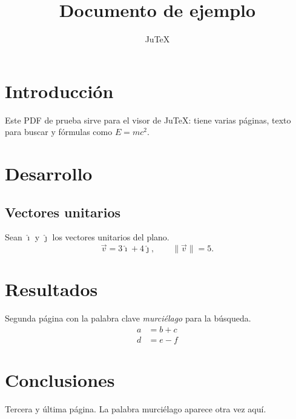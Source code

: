 \documentclass[11pt]{article}
\title{Documento de ejemplo}
\author{JuTeX}
\date{}
\begin{document}
\maketitle

\section{Introducción}
Este PDF de prueba sirve para el visor de JuTeX: tiene varias páginas,
texto para buscar y fórmulas como $E = mc^2$.

\section{Desarrollo}
\subsection{Vectores unitarios}
Sean $\hat{\imath}$ y $\hat{\jmath}$ los vectores unitarios del plano.
\begin{equation}
  \vec{v} = 3\hat{\imath} + 4\hat{\jmath}, \qquad \lVert \vec{v} \rVert = 5.
\end{equation}

\newpage
\section{Resultados}
Segunda página con la palabra clave \emph{murciélago} para la búsqueda.
\begin{align}
  a &= b + c \\
  d &= e - f
\end{align}

\newpage
\section{Conclusiones}
Tercera y última página. La palabra murciélago aparece otra vez aquí.
\end{document}

